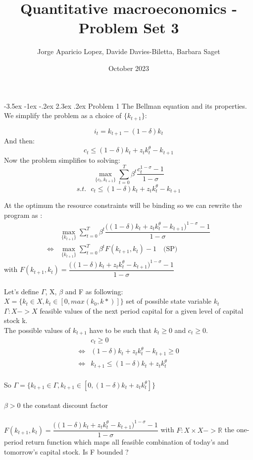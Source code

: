 \documentclass[11pt]{article}
\title{Quantitative macroeconomics - Problem Set 3}
\author{Jorge Aparicio Lopez, Davide Davies-Biletta, Barbara Saget }
\date{October 2023}
\makeatletter
\renewcommand\section{\leftskip 0pt\@startsection {section}{1}{\z@}%
	{-3.5ex \@plus -1ex \@minus -.2ex}%
	{2.3ex \@plus.2ex}%
	{\normalfont\Large\bfseries}}
\makeatother
\begin{document}
	\setcounter{page}{1}
	\begin{spacing}{1.5}
		
		\maketitle
		
		\section{Problem 1 The Bellman equation and its properties.}
		We simplify the problem as a choice of $\{k_{t+1}\}$: 
		
		$$i_t = k_{t+1}-(1-\delta)k_t$$
		And then:
		$$c_t \leq (1-\delta)k_t + z_t k_{t}^\theta-k_{t+1}$$
		Now the problem simplifies to solving: 
		\[ \max_{\{c_t, k_{t+1}\}} \sum^T_{t=0} \beta ^t \dfrac{c_t^{1-\sigma} - 1 }{1 - \sigma}\]
		\[s.t. \:\:\: c_t \leq (1-\delta)k_t + z_t k_{t}^\theta-k_{t+1} \]
		
		At the optimum the resource constraints will be binding so we can rewrite the program as : 
		\begin{align*}
			&\max_{\{k_{t+1}\}} \sum^T_{t=0} \beta ^t \dfrac{\big((1-\delta)k_t + z_t k_{t}^\theta-k_{t+1}\big)^{1-\sigma} - 1 }{1 - \sigma}  \\
			\iff& \max_{\{k_{t+1}\}} \sum^T_{t=0} \beta ^t F(k_{t+1}, k_t)-1 \quad \text{(SP)} 
		\end{align*}
		with $F(k_{t+1}, k_t)= \dfrac{\big((1-\delta)k_t + z_t k_{t}^\theta-k_{t+1}\big)^{1-\sigma} - 1 }{1 - \sigma} $
		\\
		\\
		Let's define $\Gamma$, X, $\beta$ and F as following:
		\\
		$X=\big\{k_t \in X, k_t \in[0, max(k_0,k*)]\big\}$ \quad set of possible state variable $k_t$
		\\
		$\Gamma : X -> X$ \quad feasible values of the next period capital for a given level of capital stock k.
		\\ 
		The possible values of $k_{t+1}$ have to be such that $k_t\ge 0$ and $c_t\ge 0$. 
		\begin{align*}
			&c_t\ge 0\\
			\iff &(1-\delta)k_t + z_t k_{t}^\theta-k_{t+1} \ge 0 \\
			\iff & k_{t+1}\le (1-\delta)k_t + z_t k_{t}^\theta  
		\end{align*}
		\\
		So $\Gamma=\big\{k_{t+1} \in \Gamma,  k_{t+1} \in[0, (1-\delta)k_t + z_t k_{t}^\theta ]\big\}$ 
		\\
		\\
		$\beta>0$ the constant discount factor
		\\
		\\
		$F(k_{t+1}, k_t)= \dfrac{\big((1-\delta)k_t + z_t k_{t}^\theta-k_{t+1}\big)^{1-\sigma} - 1 }{1 - \sigma} $ with $F:X\times X -> \mathbb{R}$ the one-period return function which maps all feasible combination of today's and tomorrow's capital stock. \color{red}Is F bounded ? \color{black}
		

\end{spacing}
\end{document}
